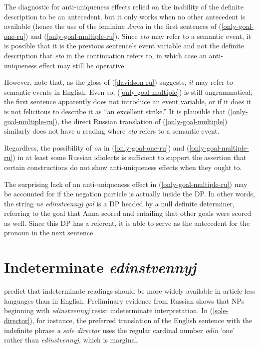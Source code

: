 \documentclass{article}
\begin{document}
The diagnostic for anti-uniqueness effects relied on the inability of the definite description to be an antecedent, but it only works when no other antecedent is available (hence the use of the feminine \textit{Anna} in the first sentences of (\ref{only-goal-one-ru}) and (\ref{only-goal-multiple-ru}). Since \textit{eto} may refer to a semantic event, it is possible that it is the previous sentence's event variable and not the definite description that \textit{eto} in the continuation refers to, in which case an anti-uniqueness effect may still be operative.

However, note that, as the gloss of (\ref{davidson-ru}) suggests, \textit{it} may refer to semantic events in English. Even so, (\ref{only-goal-multiple}) is still ungrammatical; the first sentence apparently does not introduce an event variable, or if it does it is not felicitous to describe it as ``an excellent strike.'' It is plausible that (\ref{only-goal-multiple-ru}), the direct Russian translation of (\ref{only-goal-multiple}) similarly does not have a reading where \textit{eto} refers to a semantic event.

Regardless, the possibility of \textit{on} in (\ref{only-goal-one-ru}) and (\ref{only-goal-multiple-ru}) in at least some Russian idiolects is sufficient to support the assertion that certain constructions do not show anti-uniqueness effects when they ought to.


The surprising lack of an anti-uniqueness effect in (\ref{only-goal-multiple-ru}) may be accounted for if the negation particle is actually inside the DP. In other words, the string \textit{ne edinstvennyj gol} is a DP headed by a null definite determiner, referring to the goal that Anna scored and entailing that other goals were scored as well. Since this DP has a referent, it is able to serve as the antecedent for the pronoun in the next sentence.

\section{Indeterminate \textit{edinstvennyj} \label{sec:indet-e}}
\citet{cb2015} predict that indeterminate readings should be more widely available in article-less languages than in English. Preliminary evidence from Russian shows that NPs beginning with \textit{edinstvennyj} resist indeterminate interpretation. In (\ref{sole-director}), for instance, the preferred translation of the English sentence with the indefinite phrase \textit{a sole director} uses the regular cardinal number \textit{odin} `one' rather than \textit{edinstvennyj}, which is marginal.
\end{document}
